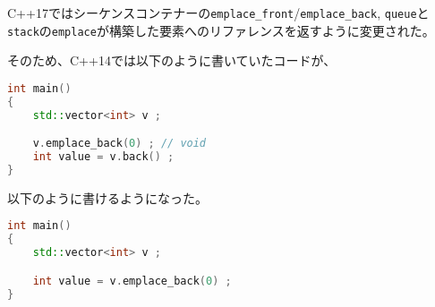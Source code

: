 %

C++17ではシーケンスコンテナーの\lstinline!emplace_front!/\lstinline!emplace_back!,
\lstinline!queue!と\lstinline!stack!の\lstinline!emplace!が構築した要素へのリファレンスを返すように変更された。

そのため、C++14では以下のように書いていたコードが、
\begin{lstlisting}[language=C++]
int main()
{
    std::vector<int> v ;

    v.emplace_back(0) ; // void
    int value = v.back() ;
}
\end{lstlisting}
以下のように書けるようになった。
\begin{lstlisting}[language=C++]
int main()
{
    std::vector<int> v ;

    int value = v.emplace_back(0) ;
}
\end{lstlisting}

